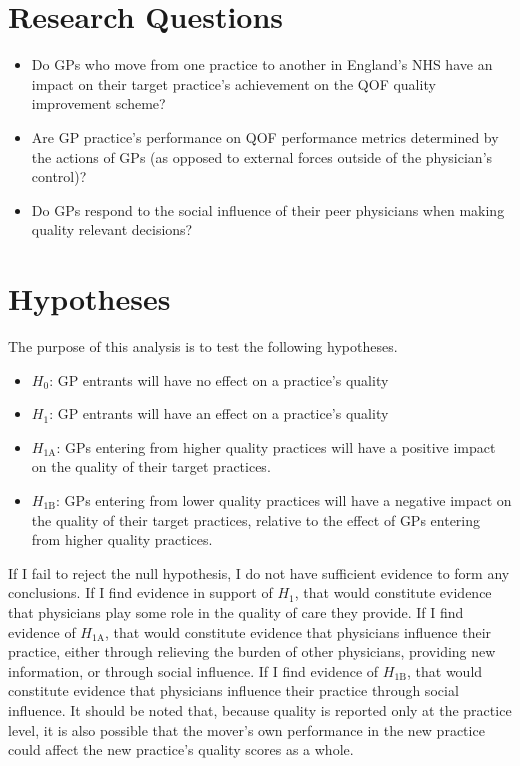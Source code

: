 \documentclass[12pt]{article}
\begin{document}
\section{Research Questions}

\begin{itemize}
  \item Do GPs who move from one practice to another in England's NHS have an impact on their target practice's achievement on the QOF quality improvement scheme?
  \item Are GP practice's performance on QOF performance metrics determined by the actions of GPs (as opposed to external forces outside of the physician's control)?
  \item Do GPs respond to the social influence of their peer physicians when making quality relevant decisions?
\end{itemize}



\section{Hypotheses}

The purpose of this analysis is to test the following hypotheses.

\begin{itemize}
  \item $H_{0}$: GP entrants will have no effect on a practice's quality
  \item $H_{1}$: GP entrants will have an effect on a practice's quality
  \item $H_{1\textrm{A}}$: GPs entering from higher quality practices will have a positive impact on the quality of their target practices.
  \item $H_{1\textrm{B}}$: GPs entering from lower quality practices will have a negative impact on the quality of their target practices, relative to the effect of GPs entering from higher quality practices.
\end{itemize}

If I fail to reject the null hypothesis, I do not have sufficient evidence to form any conclusions. If I find evidence in support of $H_{1}$, that would constitute evidence that physicians play some role in the quality of care they provide. If I find evidence of $H_{1\textrm{A}}$, that would constitute evidence that physicians influence their practice, either through relieving the burden of other physicians, providing new information, or through social influence. If I find evidence of $H_{1\textrm{B}}$, that would constitute evidence that physicians influence their practice through social influence. It should be noted that, because quality is reported only at the practice level, it is also possible that the mover's own performance in the new practice could affect the new practice's quality scores as a whole.
\end{document}
